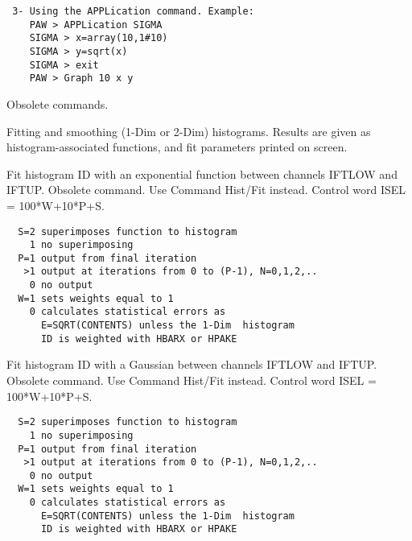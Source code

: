 \begin{verbatim}
 3- Using the APPLication command. Example:
    PAW > APPLication SIGMA
    SIGMA > x=array(10,1#10)
    SIGMA > y=sqrt(x)
    SIGMA > exit
    PAW > Graph 10 x y
\end{verbatim}
\ENDTEXT


\BEGTEXT
Obsolete commands.
\ENDTEXT



\BEGTEXT
Fitting and smoothing (1-Dim or 2-Dim) histograms.
Results are given as histogram-associated functions,
and fit parameters printed on screen.
\ENDTEXT

\BEGARG
{}
\ENDARG
\BEGTEXT
Fit histogram ID with an exponential function between channels
IFTLOW and IFTUP.
Obsolete command. Use Command Hist/Fit instead.
Control word ISEL = 100*W+10*P+S.
\begin{verbatim}
  S=2 superimposes function to histogram
    1 no superimposing
  P=1 output from final iteration
   >1 output at iterations from 0 to (P-1), N=0,1,2,..
    0 no output
  W=1 sets weights equal to 1
    0 calculates statistical errors as
      E=SQRT(CONTENTS) unless the 1-Dim  histogram
      ID is weighted with HBARX or HPAKE
\end{verbatim}
\ENDTEXT

\BEGARG
{}
\ENDARG
\BEGTEXT
Fit histogram ID with a Gaussian between channels IFTLOW and IFTUP.
Obsolete command. Use Command Hist/Fit instead.
Control word ISEL = 100*W+10*P+S.
\begin{verbatim}
  S=2 superimposes function to histogram
    1 no superimposing
  P=1 output from final iteration
   >1 output at iterations from 0 to (P-1), N=0,1,2,..
    0 no output
  W=1 sets weights equal to 1
    0 calculates statistical errors as
      E=SQRT(CONTENTS) unless the 1-Dim  histogram
      ID is weighted with HBARX or HPAKE
\end{verbatim}
\ENDTEXT

